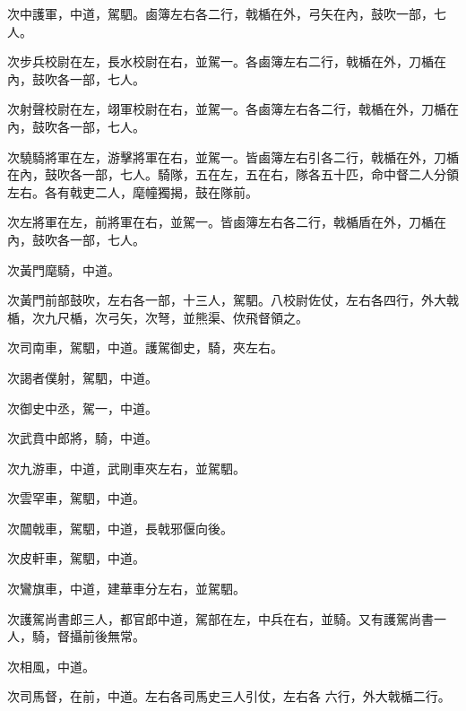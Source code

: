 \begin{pinyinscope}
 次中護軍，中道，駕駟。鹵簿左右各二行，戟楯在外，弓矢在內，鼓吹一部，七人。



 次步兵校尉在左，長水校尉在右，並駕一。各鹵簿左右二行，戟楯在外，刀楯在內，鼓吹各一部，七人。



 次射聲校尉在左，翊軍校尉在右，並駕一。各鹵簿左右各二行，戟楯在外，刀楯在內，鼓吹各一部，七人。



 次驍騎將軍在左，游擊將軍在右，並駕一。皆鹵簿左右引各二行，戟楯在外，刀楯在內，鼓吹各一部，七人。騎隊，五在左，五在右，隊各五十匹，命中督二人分領左右。各有戟吏二人，麾幢獨揭，鼓在隊前。



 次左將軍在左，前將軍在右，並駕一。皆鹵簿左右各二行，戟楯盾在外，刀楯在內，鼓吹各一部，七人。



 次黃門麾騎，中道。



 次黃門前部鼓吹，左右各一部，十三人，駕駟。八校尉佐仗，左右各四行，外大戟楯，次九尺楯，次弓矢，次弩，並熊渠、佽飛督領之。



 次司南車，駕駟，中道。護駕御史，騎，夾左右。



 次謁者僕射，駕駟，中道。



 次御史中丞，駕一，中道。



 次武賁中郎將，騎，中道。



 次九游車，中道，武剛車夾左右，並駕駟。



 次雲罕車，駕駟，中道。



 次闒戟車，駕駟，中道，長戟邪偃向後。



 次皮軒車，駕駟，中道。



 次鸞旗車，中道，建華車分左右，並駕駟。



 次護駕尚書郎三人，都官郎中道，駕部在左，中兵在右，並騎。又有護駕尚書一人，騎，督攝前後無常。



 次相風，中道。



 次司馬督，在前，中道。左右各司馬史三人引仗，左右各
 六行，外大戟楯二行。




\end{pinyinscope}
